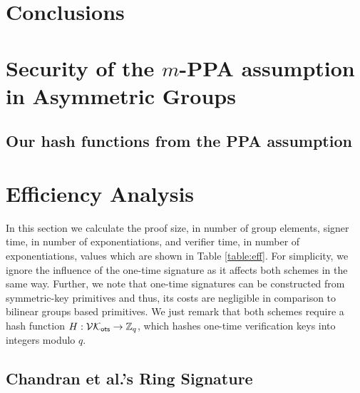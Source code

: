 \documentclass{llncs}
\begin{document}
	\section{Conclusions}

		





\appendix

	\section{Security of the $m$-PPA assumption in Asymmetric Groups} \label{sec:aPPA}
	
		
		
		\subsection{Our hash functions from the PPA assumption}

		



%

	\section{Efficiency Analysis} \label{sec:eff-analysis}
		In this section we calculate the proof size, in number of group elements, signer time, in number of exponentiations, and verifier time, in number of exponentiations, values which are shown in Table \ref{table:eff}. For simplicity, we ignore the influence of the one-time signature as it affects both schemes in the same way. Further, we note that one-time signatures can be constructed from symmetric-key primitives and thus, its costs are negligible in comparison to bilinear groups based primitives. We just remark that both schemes require a hash function $H:\mathcal{VK}_{\mathsf{ots}}\to\mathbb{Z}_q$, which hashes one-time verification keys into integers modulo $q$.
		\subsection{Chandran et al.'s Ring Signature}
			
\end{document}
